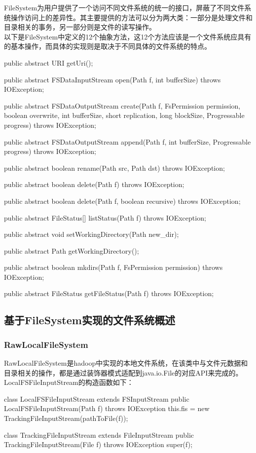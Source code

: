     FileSystem为用户提供了一个访问不同文件系统的统一的接口，屏蔽了不同文件系统操作访问上的差异性。其主要提供的方法可以分为两大类：一部分是处理文件和目录相关的事务，另一部分则是文件的读写操作。\\
    以下是FileSystem中定义的12个抽象方法，这12个方法应该是一个文件系统应具有的基本操作，而具体的实现则是取决于不同具体的文件系统的特点。
    \begin{java}[caption=FileSystem abstract method]
public abstract URI getUri();

public abstract FSDataInputStream open(Path f, int bufferSize) throws IOException;

public abstract FSDataOutputStream create(Path f,
    FsPermission permission,
    boolean overwrite,
    int bufferSize,
    short replication,
    long blockSize,
    Progressable progress) throws IOException;

public abstract FSDataOutputStream append(Path f, int bufferSize, Progressable progress) throws IOException;

public abstract boolean rename(Path src, Path dst) throws IOException;

public abstract boolean delete(Path f) throws IOException;

public abstract boolean delete(Path f, boolean recursive) throws IOException;

public abstract FileStatus[] listStatus(Path f) throws IOException;

public abstract void setWorkingDirectory(Path new_dir);

public abstract Path getWorkingDirectory();

public abstract boolean mkdirs(Path f, FsPermission permission) throws IOException;

public abstract FileStatus getFileStatus(Path f) throws IOException;

    \end{java}

\subsection{基于FileSystem实现的文件系统概述}
    \subsubsection{RawLocalFileSystem}
        RawLocalFileSystem是hadoop中实现的本地文件系统，在该类中与文件元数据和目录相关的操作，都是通过装饰器模式适配到java.io.File的对应API来完成的。\\
        LocalFSFileInputStream的构造函数如下：
        \begin{java}[caption=LocalFSFileInputStream]
class LocalFSFileInputStream extends FSInputStream {
    public LocalFSFileInputStream(Path f) throws IOException {
        this.fis = new TrackingFileInputStream(pathToFile(f));
    }
}
        \end{java}
        \begin{java}[caption=TrackingFileInputStream]
class TrackingFileInputStream extends FileInputStream {
    public TrackingFileInputStream(File f) throws IOException {
        super(f);
    }
}
\end{java}

